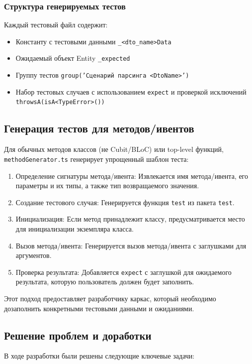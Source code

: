 \documentclass[14pt, russian]{scrartcl}
\begin{document}
\subsubsection{Структура генерируемых тестов}

Каждый тестовый файл содержит:
\begin{itemize}
    \item Константу с тестовыми данными \texttt{\_<dto\_name>Data}
    \item Ожидаемый объект Entity \texttt{\_expected}
    \item Группу тестов \texttt{group('Сценарий парсинга <DtoName>')}
    \item Набор тестовых случаев с использованием \texttt{expect} и проверкой исключений \texttt{throwsA(isA<TypeError>())}
\end{itemize}

\subsection{Генерация тестов для методов/ивентов}

Для обычных методов классов (не Cubit/BLoC) или top-level функций, \texttt{methodGenerator.ts} генерирует упрощенный шаблон теста:
\begin{enumerate}
    \item Определение сигнатуры метода/ивента: Извлекается имя метода/ивента, его параметры и их типы, а также тип возвращаемого значения.
    \item Создание тестового случая: Генерируется функция \texttt{test} из пакета \texttt{test}.
    \item Инициализация: Если метод принадлежит классу, предусматривается место для инициализации экземпляра класса.
    \item Вызов метода/ивента: Генерируется вызов метода/ивента с заглушками для аргументов.
    \item Проверка результата: Добавляется \texttt{expect} с заглушкой для ожидаемого результата, которую пользователь должен будет заполнить.
\end{enumerate}
Этот подход предоставляет разработчику каркас, который необходимо дозаполнить конкретными тестовыми данными и ожиданиями.

\subsection{Решение проблем и доработки}
В ходе разработки были решены следующие ключевые задачи:
\end{document}
